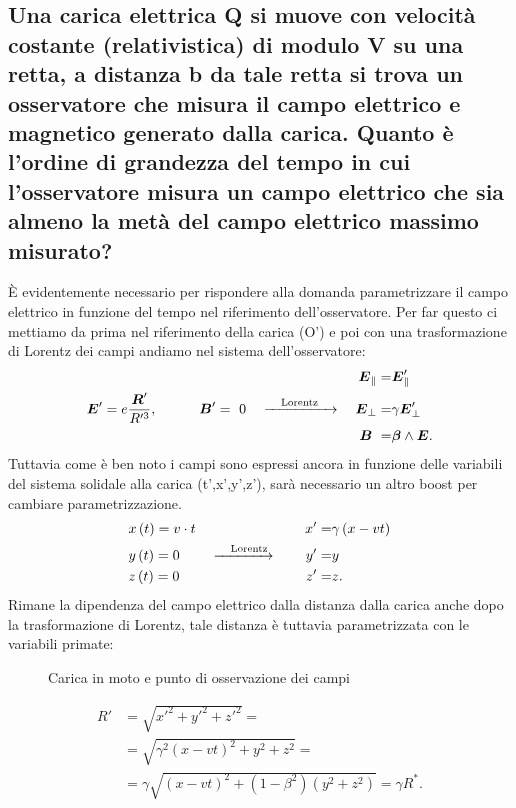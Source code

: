\subsection[]{Una carica elettrica Q si muove con velocità costante (relativistica) di modulo V su una retta, a distanza b da tale retta si trova un osservatore che misura il campo elettrico e magnetico generato dalla carica. Quanto è l'ordine di grandezza del tempo in cui l'osservatore misura un campo elettrico che sia almeno la metà del campo elettrico massimo misurato?}
\label{sec:3.a.15}
È evidentemente necessario per rispondere alla domanda parametrizzare il campo elettrico in funzione del tempo nel riferimento dell'osservatore. Per far questo ci mettiamo da prima nel riferimento della carica (O') e poi con una trasformazione di Lorentz dei campi andiamo nel sistema dell'osservatore:
\begin{align*}
&									&&						&\boldsymbol{E}_{\|}=&\boldsymbol{E}'_{\|} \\
& \bs{E}'= e \frac{\bs{R}'}{R'^3}, \quad \quad \quad \bs{B}'= \ 0	 &\ce{->[\quad \text{Lorentz}\quad]}&		&\bs{E}_{\bot}=&\gamma\bs{E}'_{\bot}\\ 
&									&&						&\bs{B}\ =&\bs{\beta}\wedge \bs{E} 
.\end{align*}
Tuttavia come è ben noto i campi sono espressi ancora in funzione delle variabili del sistema solidale alla carica (t',x',y',z'), sarà necessario un altro boost per cambiare parametrizzazione.
\begin{align*}
	&x\left( t \right) = v\cdot t	&&					&x'=&\gamma\left( x-vt \right) \\
	&y\left( t \right) = 0		&\ce{ ->[\quad \text{Lorentz}] \quad}&	&y'=&y \\
	&z\left( t \right) = 0		&&					&z'=&z
.\end{align*}
Rimane la dipendenza del campo elettrico dalla distanza dalla carica anche dopo la trasformazione di Lorentz, tale distanza è tuttavia parametrizzata con le variabili primate: 
\begin{figure}[ht]
    \centering
    \caption{Carica in moto e punto di osservazione dei campi}
    \label{fig:moto-carica}
\end{figure}
\begin{align*}
	R'& = \sqrt{x'^2 + y'^2 + z'^2} =\\ 
	&=\sqrt{\gamma^2\left( x-vt \right)^2 + y^2 + z^2} =\\ 
	&=\gamma \sqrt{\left( x-vt \right)^2 + \left( 1-\beta^2 \right)\left( y^2+z^2 \right)}=\gamma R^{*} 
.\end{align*}	
